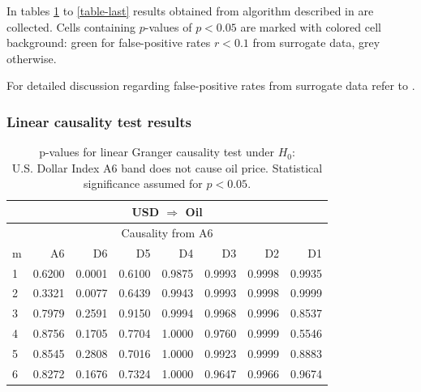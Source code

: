 In tables \ref{table-first} to \ref{table-last} results obtained from algorithm described in  are collected.
Cells containing $p$-values of $p<0.05$ are marked with colored cell background:
green for false-positive rates $r<0.1$ from surrogate data, grey otherwise.

For detailed discussion regarding false-positive rates from surrogate data refer to .


\subsubsection{Linear causality test results}

%
%
\begin{table}[H]
\begin{center}
\begin{tabular}{l|r r r r r r r}
\hline\hline
\multicolumn{8}{c}{USD $\Rightarrow$ Oil}\\
\hline
\multicolumn{8}{c}{Causality from A6}\\
\hline\hline
m & A6 & D6 & D5 & D4 & D3 & D2 & D1 \\
\hline
1 & 0.6200 & \cellcolor{mygrey}0.0001 & 0.6100 & 0.9875 & 0.9993 & 0.9998 & 0.9935 \\
2 & 0.3321 & \cellcolor{mygrey}0.0077 & 0.6439 & 0.9943 & 0.9993 & 0.9998 & 0.9999 \\
3 & 0.7979 & 0.2591 & 0.9150 & 0.9994 & 0.9968 & 0.9996 & 0.8537 \\
4 & 0.8756 & 0.1705 & 0.7704 & 1.0000 & 0.9760 & 0.9999 & 0.5546 \\
5 & 0.8545 & 0.2808 & 0.7016 & 1.0000 & 0.9923 & 0.9999 & 0.8883 \\
6 & 0.8272 & 0.1676 & 0.7324 & 1.0000 & 0.9647 & 0.9966 & 0.9674 \\
\hline\hline
\end{tabular}
\caption{p-values for linear Granger causality test under $H_0$:\\
U.S. Dollar Index A6 band does not cause oil price. Statistical significance assumed for $p<0.05$.} 
\label{table-first}
\end{center}
\end{table}

